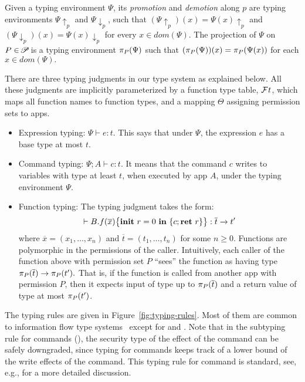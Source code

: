 {{{\begin{definition}\label{def:tenv-pd}
  Given a typing environment $\Psi$, its {\em promotion} and {\em demotion} along $p$
  are typing environments $\Psi\!\uparrow_p$ and $\Psi\!\downarrow_p$, such that
$(\Psi\!\uparrow_{p})(x) = \Psi(x)\!\uparrow_{p}$ and
$(\Psi\!\downarrow_{p})(x) = \Psi(x)\!\downarrow_{p}$ for every $x \in dom(\Psi).$
  The projection of $\Psi$ on $P \in \PPS$ is a typing environment $\app{\Psi}{P}$ such that
$(\app{\Psi}{P})(x) = \app{\Psi(x)}{P}$ for each $x \in dom(\Psi).$
\end{definition}

There are three typing judgments in our type system as explained below. All these judgments are implicitly parameterized by
a function type table, $\FT$, which maps all function names to function types, and a mapping $\Theta$ assigning permission sets to apps.

\begin{itemize}
\item Expression typing: $\Psi \vdash e : t.$
This says that under $\Psi$,
the expression $e$ has a base type at most $t$.

\item Command typing: $\Psi; A \vdash c : t$.
It means that the command $c$ writes to variables with type at least $t$, when
executed by app $A$, under the typing environment $\Psi.$

\item Function typing:
The typing judgment takes the form: 
{\myeqsize\begin{equation*}
\vdash \lpFUN{B.f}{\overline{x}}{c} :  \overline{t} \xrightarrow{} t'	
\end{equation*}}
where $\overline{x} = (x_1,\dots,x_n)$ and
$\overline{t} = (t_1,\dots,t_n)$ for some $n \geq 0.$
Functions are
polymorphic in the permissions of the caller.
Intuitively, each caller of the function above with permission set $P$
``sees'' the function as having type
$\app{\overline{t}}{P} \rightarrow \app{t'}{P}.$
That is, if the function is called from another app with permission $P$,
then it expects input of type up to $\app{\overline{t}}{P}$ and
a return value of type at most $\app{t'}{P}$.

\end{itemize}
The typing rules are given in Figure~\ref{fig:typing-rules}.
Most of them are common to
information flow type systems~\cite{Volpano:1996,Banerjee:2005ht,Sabelfeld:2003} except for  and . Note that in the subtyping rule for commands (), the security type of the effect of the command
can be safely downgraded, since typing for commands keeps track of a lower bound of the write effects of the command. This typing rule for
command is standard, see, e.g., \cite{Volpano:1996} for a more detailed discussion.

}}}
